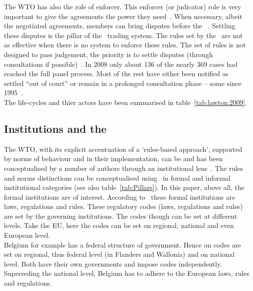 The WTO has also the role of enforcer. 
This enforcer (or judicator) role is very important to give the agreements the power they need~\cite{Bown:2010}.
When necessary, albeit the negotiated agreements, members can bring disputes before the \wto~\citep{WTO:2013c}. 
Settling these disputes is the pillar of the \wto~trading system. The rules set by the \wto~are not as effective when there is no system to enforce these rules. The set of rules is not designed to pass judgement, the priority is to settle disputes (through consultations if possible)~\citep{WTO:2013a}.  
In 2008 only about 136 of the nearly 369 cases had reached the full panel process. Most of the rest have either been notified as settled ``out of court'' or remain in a prolonged consultation phase -- some since 1995~\citep{WTO:2012GATT}.\\
The life-cycles and thier actors have been summarised in table~\ref{tab:lawton:2009}.



\subsection[Institutions and the WTO]{Institutions and the~\wto}\label{sec:institutions}  %

The WTO, with its explicit accentuation of a ‘rules-based approach’, supported by norms of behaviour and in their implementation, can be and has been conceptualised 
by a number of authors through an institutional lens~\citep{Wilkinson:2013,Kim:2002wc,Herschinger:2012uk,Sokol:2009wr,Reich:2004tf,Bhagwati:2003,Irwin:2003}.
The rules and norms distinctions can be conceptualised using~\cite{North:1990vl} in formal and informal institutional categories (see also table~\ref{tab:Pillars}). 
In this paper, above all, the formal institutions are of interest. 
According to~\citep{North:1990vl} these formal institutions are laws, regulations and rules. 
These regulatory codes (laws, regulations and rules) are set by the governing institutions.
The codes though can be set at different levels.
Take the \gls{EU}, here the codes can be set on regional, national and even European level. \\
Belgium for example has a federal structure of government. 
Hence on codes are set on regional, thus federal level (in Flanders and Wallonia) and on national level. 
Both have their own governments and impose codes independently. 
Superseding the national level, Belgium has to adhere to the European laws, rules and regulations. 

